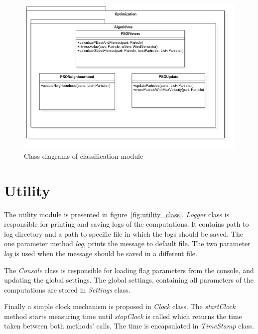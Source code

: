 \documentclass{mini}
\begin{document}
\begin{figure}[H]
    \centering
    \includegraphics[width=1.0\textwidth]{../uml/classes/optimizationAlg.jpg}
    \caption{Class diagrams of classification module}
    \label{fig:classification_alg_class}
\end{figure}


\newpage
\section{Utility}

The utility module is presented in figure~\ref{fig:utility_class}. \textit{Logger} class is responsible for printing and saving logs of the computations. It contains path to log directory and a path to specific file in which the logs should be saved. The one parameter method \textit{log}, prints the message to default file. The two parameter \textit{log} is used when the message should be saved in a different file.

The \textit{Console} class is responsible for loading flag parameters from the console, and updating the global settings. The global settings, containing all parameters of the computations are stored in \textit{Settings} class.

Finally a simple clock mechanism is proposed in \textit{Clock} class. The \textit{startClock} method starts measuring time until \textit{stopClock} is called which returns the time taken between both methods' calls. The time is encapsulated in \textit{TimeStamp} class.
\end{document}
